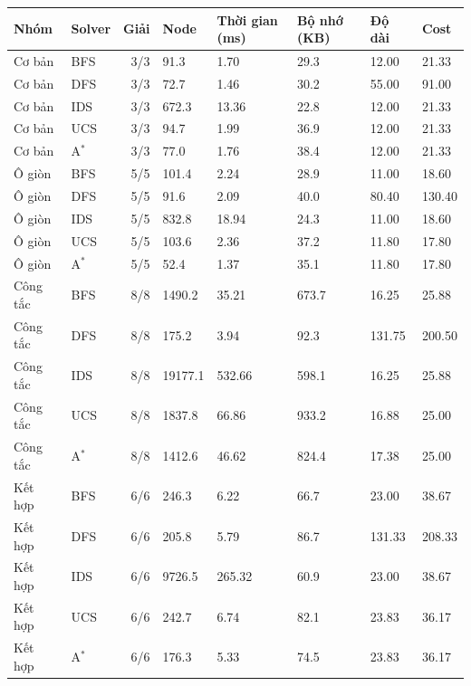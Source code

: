 \begin{tabular}{llrlllll}
\hline
Nhóm & Solver & Giải & Node & Thời gian (ms) & Bộ nhớ (KB) & Độ dài & Cost \\
\hline
Cơ bản & BFS & 3/3 & 91.3 & 1.70 & 29.3 & 12.00 & 21.33 \\
Cơ bản & DFS & 3/3 & 72.7 & 1.46 & 30.2 & 55.00 & 91.00 \\
Cơ bản & IDS & 3/3 & 672.3 & 13.36 & 22.8 & 12.00 & 21.33 \\
Cơ bản & UCS & 3/3 & 94.7 & 1.99 & 36.9 & 12.00 & 21.33 \\
Cơ bản & A$^*$ & 3/3 & 77.0 & 1.76 & 38.4 & 12.00 & 21.33 \\
\hline
Ô giòn & BFS & 5/5 & 101.4 & 2.24 & 28.9 & 11.00 & 18.60 \\
Ô giòn & DFS & 5/5 & 91.6 & 2.09 & 40.0 & 80.40 & 130.40 \\
Ô giòn & IDS & 5/5 & 832.8 & 18.94 & 24.3 & 11.00 & 18.60 \\
Ô giòn & UCS & 5/5 & 103.6 & 2.36 & 37.2 & 11.80 & 17.80 \\
Ô giòn & A$^*$ & 5/5 & 52.4 & 1.37 & 35.1 & 11.80 & 17.80 \\
\hline
Công tắc & BFS & 8/8 & 1490.2 & 35.21 & 673.7 & 16.25 & 25.88 \\
Công tắc & DFS & 8/8 & 175.2 & 3.94 & 92.3 & 131.75 & 200.50 \\
Công tắc & IDS & 8/8 & 19177.1 & 532.66 & 598.1 & 16.25 & 25.88 \\
Công tắc & UCS & 8/8 & 1837.8 & 66.86 & 933.2 & 16.88 & 25.00 \\
Công tắc & A$^*$ & 8/8 & 1412.6 & 46.62 & 824.4 & 17.38 & 25.00 \\
\hline
Kết hợp & BFS & 6/6 & 246.3 & 6.22 & 66.7 & 23.00 & 38.67 \\
Kết hợp & DFS & 6/6 & 205.8 & 5.79 & 86.7 & 131.33 & 208.33 \\
Kết hợp & IDS & 6/6 & 9726.5 & 265.32 & 60.9 & 23.00 & 38.67 \\
Kết hợp & UCS & 6/6 & 242.7 & 6.74 & 82.1 & 23.83 & 36.17 \\
Kết hợp & A$^*$ & 6/6 & 176.3 & 5.33 & 74.5 & 23.83 & 36.17 \\
\hline
\end{tabular}
